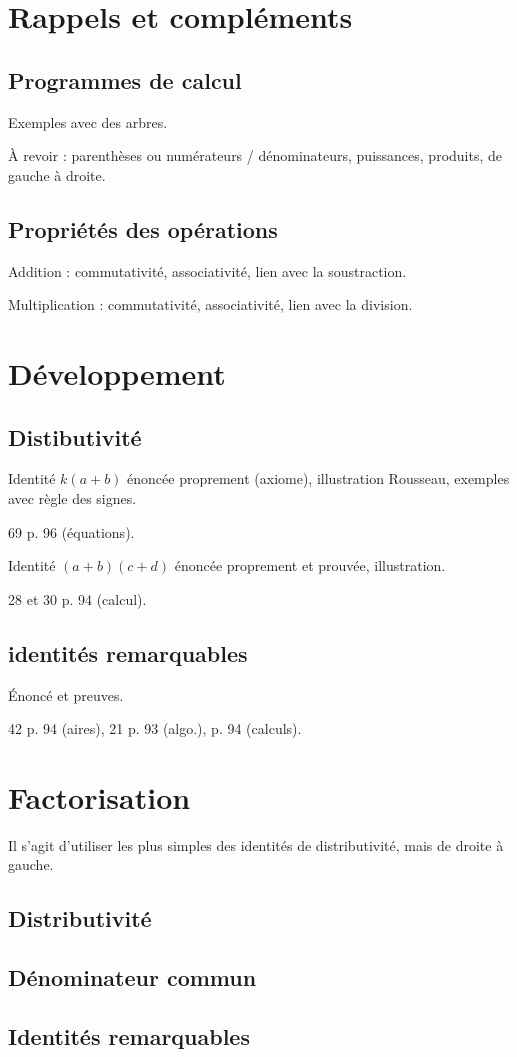 \documentclass[a4paper,11pt,DIV18,BCOR0mm]{scrartcl}
\begin{document}
\section{Rappels et compléments}
\subsection{Programmes de calcul}
Exemples avec des arbres.

À revoir : parenthèses ou numérateurs / dénominateurs, puissances, produits,
de gauche à droite.
\subsection{Propriétés des opérations}
Addition : commutativité, associativité, lien avec la soustraction.

Multiplication : commutativité, associativité, lien avec la division.

\section{Développement}
\subsection{Distibutivité}
Identité $k(a+b)$ énoncée proprement (axiome), illustration Rousseau, exemples avec règle des signes.
\begin{exercice}
 69 p. 96 (équations).
\end{exercice}

Identité $(a+b)(c+d)$ énoncée proprement et prouvée, illustration.
\begin{exercice}
 28 et 30 p. 94 (calcul).
\end{exercice}

\subsection{identités remarquables}
Énoncé et preuves.

\begin{exercice}
 42 p. 94 (aires), 21 p. 93 (algo.), p. 94 (calculs).
\end{exercice}



\section{Factorisation}
Il s'agit d'utiliser les plus simples des identités de distributivité, mais de droite à gauche.
\subsection{Distributivité}

\subsection{Dénominateur commun}
\subsection{Identités remarquables}
\end{document}
